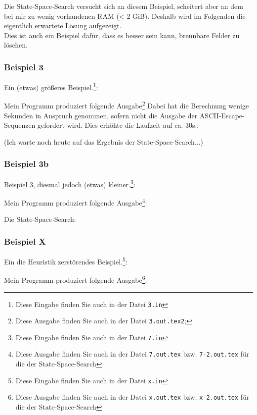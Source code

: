 Die State-Space-Search versucht sich an diesem Beispiel, scheitert aber an dem bei mir zu wenig vorhandenen RAM (< 2 GiB). Deshalb wird im Folgenden die eigentlich erwartete Lösung aufgezeigt.\\
Dies ist auch ein Beispiel dafür, dass es besser sein kann, brennbare Felder zu löschen.

{\ttfamily \small

}

\subsubsection*{Beispiel 3}
Ein (etwas) größeres Beispiel.\footnote{Diese Eingabe finden Sie auch in der Datei \texttt{3.in}}:
{\small

}
Mein Programm produziert folgende Ausgabe\footnote{Diese Ausgabe finden Sie auch in der Datei \texttt{3.out.tex2};} Dabei hat die Berechnung wenige Sekunden in Anspruch genommen, sofern nicht die Ausgabe der ASCII-Escape-Sequenzen gefordert wird. Dies erhöhte die Laufzeit auf ca. 30s.:\\

{\ttfamily \small

}

(Ich warte noch heute auf das Ergebnis der State-Space-Search...)

\subsubsection*{Beispiel 3b}
Beispiel 3, diesmal jedoch (etwas) kleiner.\footnote{Diese Eingabe finden Sie auch in der Datei \texttt{7.in}}:
{\small

}
Mein Programm produziert folgende Ausgabe\footnote{Diese Ausgabe finden Sie auch in der Datei \texttt{7.out.tex} bzw. \texttt{7-2.out.tex} für die der State-Space-Search}:\\
{\ttfamily \small

}

Die State-Space-Search:

{\ttfamily \small

}


\subsubsection*{Beispiel X}
Ein die Heuristik zerstörendes Beispiel.\footnote{Diese Eingabe finden Sie auch in der Datei \texttt{x.in}}:
{\small

}
Mein Programm produziert folgende Ausgabe\footnote{Diese Ausgabe finden Sie auch in der Datei \texttt{x.out.tex} bzw. \texttt{x-2.out.tex} für die der State-Space-Search}:\\
{\ttfamily \small

}

